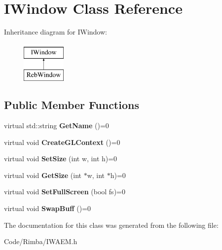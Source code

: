 \hypertarget{class_i_window}{}\section{I\+Window Class Reference}
\label{class_i_window}
Inheritance diagram for I\+Window\+:\begin{figure}[H]
\begin{center}
\leavevmode
\includegraphics[height=2.000000cm]{class_i_window}
\end{center}
\end{figure}
\subsection*{Public Member Functions}
\begin{DoxyCompactItemize}
\item 
virtual std\+::string {\bfseries Get\+Name} ()=0\hypertarget{class_i_window_a153877b9f3d15eaaacd9d6d81513635a}{}\label{class_i_window_a153877b9f3d15eaaacd9d6d81513635a}

\item 
virtual void {\bfseries Create\+G\+L\+Context} ()=0\hypertarget{class_i_window_a9463fe4132cbcce240365e7299bbf8ea}{}\label{class_i_window_a9463fe4132cbcce240365e7299bbf8ea}

\item 
virtual void {\bfseries Set\+Size} (int w, int h)=0\hypertarget{class_i_window_ad93f236da8028020d5adb3df2e54b229}{}\label{class_i_window_ad93f236da8028020d5adb3df2e54b229}

\item 
virtual void {\bfseries Get\+Size} (int $\ast$w, int $\ast$h)=0\hypertarget{class_i_window_a2ed48de2a80cff398aa1abeb428847ca}{}\label{class_i_window_a2ed48de2a80cff398aa1abeb428847ca}

\item 
virtual void {\bfseries Set\+Full\+Screen} (bool fs)=0\hypertarget{class_i_window_ad0a4a80c0c556df1a42cfd04e56ad4c4}{}\label{class_i_window_ad0a4a80c0c556df1a42cfd04e56ad4c4}

\item 
virtual void {\bfseries Swap\+Buff} ()=0\hypertarget{class_i_window_adff844ec87f9cce2a84ea69bde3c7182}{}\label{class_i_window_adff844ec87f9cce2a84ea69bde3c7182}

\end{DoxyCompactItemize}


The documentation for this class was generated from the following file\+:\begin{DoxyCompactItemize}
\item 
Code/\+Rimba/I\+W\+A\+E\+M.\+h\end{DoxyCompactItemize}
